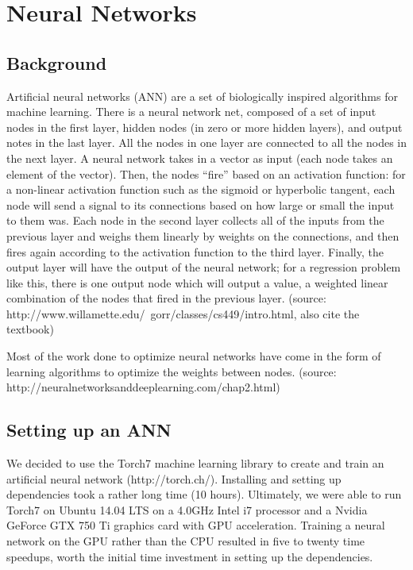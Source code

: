 \documentclass{article}
\begin{document}
\maketitle


\section{Neural Networks}

\subsection{Background}

Artificial neural networks (ANN) are a set of biologically inspired algorithms
for machine learning.  There is a neural network net, composed of a set of input
 nodes in the first layer, hidden nodes (in zero or more hidden layers), and output
  notes in the last layer. All the nodes in one layer are connected to all the nodes 
  in the next layer.  A neural network takes in a vector as input (each node takes an 
  element of the vector).  Then, the nodes “fire” based on an activation function: 
  for a non-linear activation function such as the sigmoid or hyperbolic tangent, 
  each node will send a signal to its connections based on how large or small the 
  input to them was.  Each node in the second layer collects all of the inputs from 
  the previous layer and weighs them linearly by weights on the connections, and then
   fires again according to the activation function to the third layer.  Finally, 
   the output layer will have the output of the neural network; for a regression 
   problem like this, there is one output node which will output a value, a 
   weighted linear combination of the nodes that fired in the previous layer.
(source: http://www.willamette.edu/~gorr/classes/cs449/intro.html, also cite the textbook)

Most of the work done to optimize neural networks have come in the form of
 learning algorithms to optimize the weights between nodes.  
 (source: http://neuralnetworksanddeeplearning.com/chap2.html)

\subsection{Setting up an ANN}

We decided to use the Torch7 machine learning library to create and 
train an artificial neural network (http://torch.ch/).  Installing and
 setting up dependencies took a rather long time (10 hours).  Ultimately, we were
  able to run Torch7 on Ubuntu 14.04 LTS on a 4.0GHz Intel i7 processor
   and a Nvidia GeForce GTX 750 Ti graphics card with GPU acceleration. 
    Training a neural network on the GPU rather than the CPU resulted in
     five to twenty time speedups, worth the initial time investment
      in setting up the dependencies.
\end{document}
